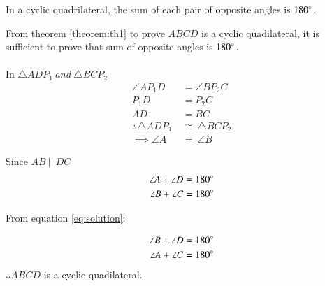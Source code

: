 \begin{theorem}\label{theorem:th1}
In a cyclic quadrilateral, the sum of each pair of opposite angles is $180\degree$.
\end{theorem}
\solution  From theorem \ref{theorem:th1} to prove $ABCD$ is a cyclic quadilateral, it is sufficient to prove that sum of opposite angles is $180\degree$. \\ \\
In $\triangle ADP_1\ and\  \triangle BCP_2$
\begin{align}
\angle AP_1D &= \angle BP_2C \nonumber \\
P_1D &= P_2C \nonumber \\
AD &= BC \nonumber \\
\therefore \triangle ADP_1\  &\cong\  \triangle BCP_2  \nonumber \\
\implies \angle A \ &=\ \angle B \label{eq:solution}
\end{align}

Since $AB\ || \ DC$ 
\begin{align}
\angle A + \angle D &= 180\degree \\
\angle B + \angle C &= 180\degree 
\end{align}

From equation \ref{eq:solution}:

\begin{align}
\angle B + \angle D &= 180\degree \\
\angle A + \angle C &= 180\degree 
\end{align}
$\therefore ABCD$ is a cyclic quadilateral.
